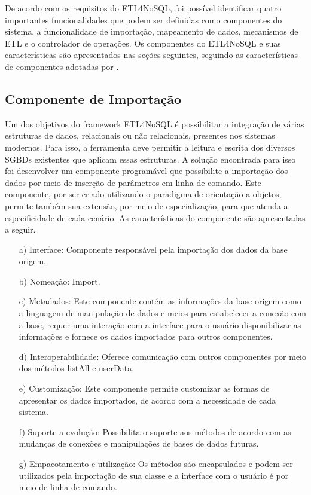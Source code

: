 De acordo com os requisitos do ETL4NoSQL, foi possível identificar quatro importantes funcionalidades que podem ser definidas como componentes do sistema, a funcionalidade de importação, mapeamento de dados, mecanismos de ETL e o controlador de operações. Os componentes do ETL4NoSQL e suas características são apresentados nas seções seguintes, seguindo as características de componentes adotadas por \cite{heineman:2001}.


\subsection{Componente de Importação}

Um dos objetivos do framework ETL4NoSQL é possibilitar a integração de várias estruturas de dados, relacionais ou não relacionais, presentes nos sistemas modernos. Para isso, a ferramenta deve permitir a leitura e escrita dos diversos SGBDs existentes que aplicam essas estruturas. A solução encontrada para isso foi desenvolver um componente programável que possibilite a importação dos dados por meio de inserção de parâmetros em linha de comando. Este componente, por ser criado utilizando o paradigma de orientação a objetos, permite também sua extensão, por meio de especialização, para que atenda a especificidade de cada cenário. As características do componente são apresentadas a seguir.

\begin{itemize}
	\item[a)] Interface: Componente responsável pela importação dos dados da base origem.
	
	\item[b)] Nomeação: Import.
	
	\item[c)] Metadados: Este componente contém as informações da base origem como a linguagem de manipulação de dados e meios para estabelecer a conexão com a base, requer uma interação com a interface para o usuário disponibilizar as informações e fornece os dados importados para outros componentes.
	
	\item[d)] Interoperabilidade: Oferece comunicação com outros componentes por meio dos métodos listAll e userData.
	
	
	
	\item[e)] Customização: Este componente permite customizar as formas de apresentar os dados importados, de acordo com a necessidade de cada sistema.
	
	\item[f)] Suporte a evolução: Possibilita o suporte aos métodos de acordo com as mudanças de conexões e manipulações de bases de dados futuras.
	
	\item[g)] Empacotamento e utilização: Os métodos são encapsulados e podem  ser utilizados pela importação de sua classe e a interface com o usuário é por meio de linha de comando.
	
\end{itemize}

